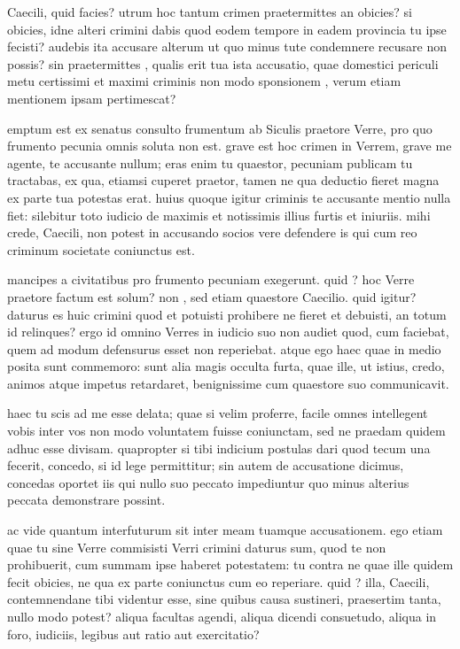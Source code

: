  Caecili, quid facies? utrum hoc tantum crimen praetermittes an obicies? si obicies, idne alteri crimini dabis quod eodem tempore in eadem provincia tu ipse fecisti? audebis ita accusare alterum ut quo minus tute condemnere recusare non possis? sin praetermittes , qualis erit tua ista accusatio, quae domestici periculi metu certissimi et maximi criminis non modo sponsionem , verum etiam mentionem ipsam pertimescat?

 emptum est ex senatus consulto frumentum ab Siculis praetore Verre, pro quo frumento pecunia omnis soluta non est. grave est hoc crimen in Verrem, grave me agente, te accusante nullum; eras enim tu quaestor, pecuniam publicam tu tractabas, ex qua, etiamsi cuperet praetor, tamen ne qua deductio fieret magna ex parte tua potestas erat. huius quoque igitur criminis te accusante mentio nulla fiet: silebitur toto iudicio de maximis et notissimis illius furtis et iniuriis. mihi crede, Caecili, non potest in accusando socios vere defendere is qui cum reo criminum societate coniunctus est.

 mancipes a civitatibus pro frumento pecuniam exegerunt. quid ? hoc Verre praetore factum est solum? non , sed etiam quaestore Caecilio. quid igitur? daturus es huic crimini quod et potuisti prohibere ne fieret et debuisti, an totum id relinques? ergo id omnino Verres in iudicio suo non audiet quod, cum faciebat, quem ad modum defensurus esset non reperiebat. atque ego haec quae in medio posita sunt commemoro: sunt alia magis occulta furta, quae ille, ut istius, credo, animos atque impetus retardaret, benignissime cum quaestore suo communicavit.

 haec tu scis ad me esse delata; quae si velim proferre, facile omnes intellegent vobis inter vos non modo voluntatem fuisse coniunctam, sed ne praedam quidem adhuc esse divisam. quapropter si tibi indicium postulas dari quod tecum una fecerit, concedo, si id lege permittitur; sin autem de accusatione dicimus, concedas oportet iis qui nullo suo peccato impediuntur quo minus alterius peccata demonstrare possint.

 ac vide quantum interfuturum sit inter meam tuamque accusationem. ego etiam quae tu sine Verre commisisti Verri crimini daturus sum, quod te non prohibuerit, cum summam ipse haberet potestatem: tu contra ne quae ille quidem fecit obicies, ne qua ex parte coniunctus cum eo reperiare. quid ? illa, Caecili, contemnendane tibi videntur esse, sine quibus causa sustineri, praesertim tanta, nullo modo potest? aliqua facultas agendi, aliqua dicendi consuetudo, aliqua in foro, iudiciis, legibus aut ratio aut exercitatio?

